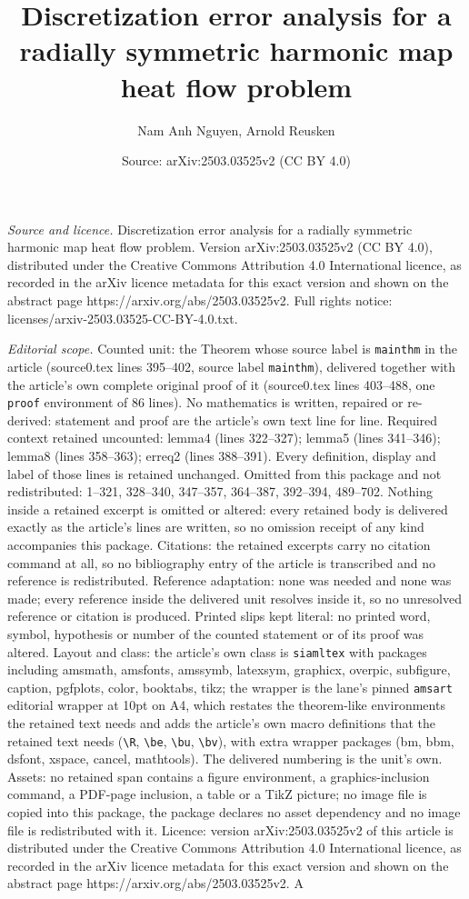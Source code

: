 \documentclass[10pt,a4paper]{amsart}
\title[Discretization error analysis for a radially symmetric harmo]{Discretization error analysis for a radially symmetric harmonic map heat flow problem}
\author{Nam Anh Nguyen, Arnold Reusken}
\date{Source: arXiv:2503.03525v2 (CC BY 4.0)}
\begin{document}
\maketitle

\noindent\emph{Source and licence.} Discretization error analysis for a radially symmetric harmonic map heat flow problem. Version arXiv:2503.03525v2 (CC BY 4.0), distributed under the Creative Commons Attribution 4.0 International licence, as recorded in the arXiv licence metadata for this exact version and shown on the abstract page https://arxiv.org/abs/2503.03525v2. Full rights notice: licenses/arxiv-2503.03525-CC-BY-4.0.txt.\par\smallskip

\noindent\textit{Editorial scope.} Counted unit: the Theorem whose source label is \texttt{mainthm} in the article (source0.tex lines 395--402, source label \texttt{mainthm}), delivered together with the article's own complete original proof of it (source0.tex lines 403--488, one \texttt{proof} environment of 86 lines). No mathematics is written, repaired or re-derived: statement and proof are the article's own text line for line. Required context retained uncounted: lemma4 (lines 322--327); lemma5 (lines 341--346); lemma8 (lines 358--363); erreq2 (lines 388--391). Every definition, display and label of those lines is retained unchanged. Omitted from this package and not redistributed: 1--321, 328--340, 347--357, 364--387, 392--394, 489--702. Nothing inside a retained excerpt is omitted or altered: every retained body is delivered exactly as the article's lines are written, so no omission receipt of any kind accompanies this package. Citations: the retained excerpts carry no citation command at all, so no bibliography entry of the article is transcribed and no reference is redistributed. Reference adaptation: none was needed and none was made; every reference inside the delivered unit resolves inside it, so no unresolved reference or citation is produced. Printed slips kept literal: no printed word, symbol, hypothesis or number of the counted statement or of its proof was altered. Layout and class: the article's own class is \texttt{siamltex} with packages including amsmath, amsfonts, amssymb, latexsym, graphicx, overpic, subfigure, caption, pgfplots, color, booktabs, tikz; the wrapper is the lane's pinned \texttt{amsart} editorial wrapper at 10pt on A4, which restates the theorem-like environments the retained text needs and adds the article's own macro definitions that the retained text needs (\texttt{\textbackslash R}, \texttt{\textbackslash be}, \texttt{\textbackslash bu}, \texttt{\textbackslash bv}), with extra wrapper packages (bm, bbm, dsfont, xspace, cancel, mathtools). The delivered numbering is the unit's own. Assets: no retained span contains a figure environment, a graphics-inclusion command, a PDF-page inclusion, a table or a TikZ picture; no image file is copied into this package, the package declares no asset dependency and no image file is redistributed with it. Licence: version arXiv:2503.03525v2 of this article is distributed under the Creative Commons Attribution 4.0 International licence, as recorded in the arXiv licence metadata for this exact version and shown on the abstract page https://arxiv.org/abs/2503.03525v2. A 
\end{document}
